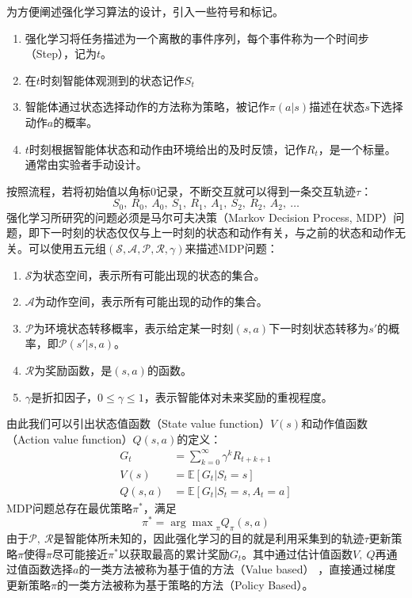 为方便阐述强化学习算法的设计，引入一些符号和标记。
\begin{enumerate}
  \item 强化学习将任务描述为一个离散的事件序列，每个事件称为一个时间步（Step），记为$t$。
  \item 在$t$时刻智能体观测到的状态记作$S_t$
  \item 智能体通过状态选择动作的方法称为策略，被记作$\pi(a|s)$描述在状态$s$下选择动作$a$的概率。
  \item $t$时刻根据智能体状态和动作由环境给出的及时反馈，记作$R_t$，是一个标量。通常由实验者手动设计。
\end{enumerate}
按照流程，若将初始值以角标$0$记录，不断交互就可以得到一条交互轨迹$\tau$：
\[
  S_0,\ R_0,\ A_0,\ S_1,\ R_1,\ A_1,\ S_2,\ R_2,\ A_2,\ \dots
\]
强化学习所研究的问题必须是马尔可夫决策（Markov Decision Process, MDP）问题，即下一时刻的状态仅仅与上一时刻的状态和动作有关，与之前的状态和动作无关。可以使用五元组$(\mathcal{S,A,P,R,}\gamma)$来描述MDP问题：
\begin{enumerate}
  \item $\mathcal{S}$为状态空间，表示所有可能出现的状态的集合。
  \item $\mathcal{A}$为动作空间，表示所有可能出现的动作的集合。
  \item $\mathcal{P}$为环境状态转移概率，表示给定某一时刻$(s,a)$下一时刻状态转移为$s'$的概率，即$\mathcal{P}(s'|s,a)$。
  \item $\mathcal{R}$为奖励函数，是$(s,a)$的函数。
  \item $\gamma$是折扣因子，$0\leq\gamma\leq 1$，表示智能体对未来奖励的重视程度。
\end{enumerate}

由此我们可以引出状态值函数（State value function）$V(s)$和动作值函数（Action value function）$Q(s,a)$的定义：
\[\begin{aligned}
  G_t &= \sum_{k=0}^{\infty} \gamma^k R_{t+k+1}\\
  V(s) &= \mathbb{E}[G_t|S_t=s]\\
  Q(s,a) &= \mathbb{E}[G_t|S_t=s,A_t=a]
\end{aligned}\]
MDP问题总存在最优策略$\pi^*$，满足
\[
  \pi^* = {\arg\max}_\pi {Q_\pi(s,a)}
\]
由于$\mathcal{P},\ \mathcal{R}$是智能体所未知的，因此强化学习的目的就是利用采集到的轨迹$\tau$更新策略$\pi$使得$\pi$尽可能接近$\pi^*$以获取最高的累计奖励$G_t$。其中通过估计值函数$V,\ Q$再通过值函数选择$a$的一类方法被称为基于值的方法（Value based） ，直接通过梯度更新策略$\pi$的一类方法被称为基于策略的方法（Policy Based）。

